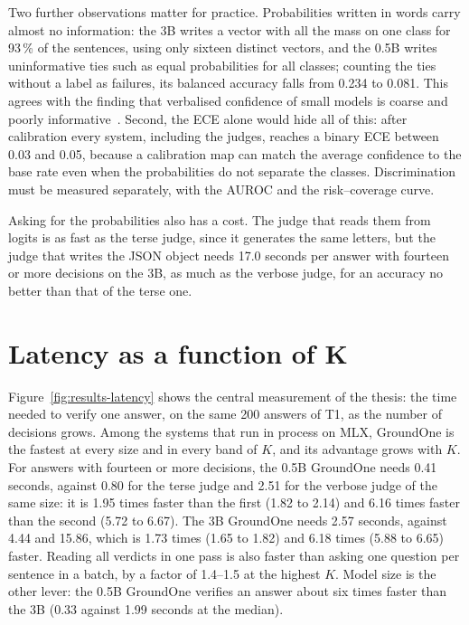Two further observations matter for practice. Probabilities written in words carry almost no information: the 3B writes
a vector with all the mass on one class for 93\,\% of the sentences, using only sixteen distinct vectors, and the 0.5B
writes uninformative ties such as equal probabilities for all classes; counting the ties without a label as failures,
its balanced accuracy falls from 0.234 to 0.081. This agrees with the finding that verbalised confidence of small models
is coarse and poorly informative~\cite{xiong2024uncertainty,tian2023justask}. Second, the ECE alone would hide all of
this: after calibration every system, including the judges, reaches a binary ECE between 0.03 and 0.05, because a
calibration map can match the average confidence to the base rate even when the probabilities do not separate the
classes. Discrimination must be measured separately, with the AUROC and the risk--coverage curve.

Asking for the probabilities also has a cost. The judge that reads them from logits is as fast as the terse judge, since
it generates the same letters, but the judge that writes the JSON object needs 17.0 seconds per answer with fourteen or
more decisions on the 3B, as much as the verbose judge, for an accuracy no better than that of the terse one.

\section{Latency as a function of K}
\label{sec:results-latency}

Figure~\ref{fig:results-latency} shows the central measurement of the thesis: the time needed to verify one answer, on
the same 200 answers of T1, as the number of decisions grows. Among the systems that run in process on MLX, GroundOne is
the fastest at every size and in every band of $K$, and its advantage grows with $K$. For answers with fourteen or more
decisions, the 0.5B GroundOne needs 0.41 seconds, against 0.80 for the terse judge and 2.51 for the verbose judge of the
same size: it is 1.95 times faster than the first (1.82 to 2.14) and 6.16 times faster than the second (5.72 to 6.67).
The 3B GroundOne needs 2.57 seconds, against 4.44 and 15.86, which is 1.73 times (1.65 to 1.82) and 6.18 times (5.88 to
6.65) faster. Reading all verdicts in one pass is also faster than asking one question per sentence in a batch, by a
factor of 1.4--1.5 at the highest $K$. Model size is the other lever: the 0.5B GroundOne verifies an answer about six
times faster than the 3B (0.33 against 1.99 seconds at the median).

